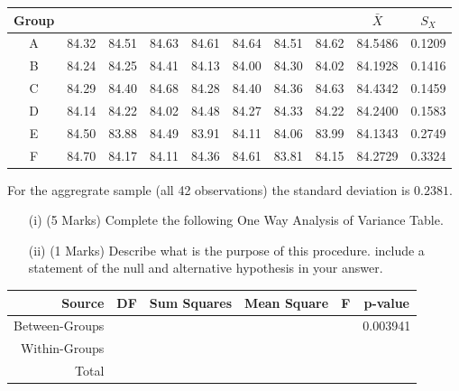 \documentclass[a4paper,12pt]{article}
\begin{document}
	\begin{tabular}{|c|ccccccc|c|c|}
		\hline
		Group &  & &  &  &  &  &  & $\bar{X}$& $S_{X}$ \\ \hline
		A & 84.32 & 84.51 & 84.63 & 84.61 & 84.64 & 84.51 & 84.62 & 84.5486 & 0.1209 \\ \hline
		B & 84.24 & 84.25 & 84.41 & 84.13 & 84.00 & 84.30 & 84.02 & 84.1928 & 0.1416 \\ \hline
		C & 84.29 & 84.40 & 84.68 & 84.28 & 84.40 & 84.36 & 84.63 & 84.4342 & 0.1459 \\ \hline
		D & 84.14 & 84.22 & 84.02 & 84.48 & 84.27 & 84.33 & 84.22 & 84.2400 & 0.1583 \\ \hline
		E & 84.50 & 83.88 & 84.49 & 83.91 & 84.11 & 84.06 & 83.99 & 84.1343 & 0.2749 \\ \hline
		F & 84.70 & 84.17 & 84.11 & 84.36 & 84.61 & 83.81 & 84.15 & 84.2729 & 0.3324 \\ \hline
	\end{tabular} 
	


\bigskip
For the aggregrate sample (all 42 observations) the standard deviation is $0.2381$.

\begin{itemize}
	\item[(i)] (5 Marks) Complete the following One Way Analysis of Variance Table.
	\item[(ii)] (1 Marks) Describe what is the purpose of this procedure. include a statement of the null and alternative hypothesis in your answer.
\end{itemize}
\begin{tabular}{|r|c|c|c|c|c|}
	\hline Source  &\phantom{sp} DF \phantom{sp} & Sum Squares & Mean Square  & \phantom{sp} F \phantom{sp} & p-value  \\ 
	\hline Between-Groups &  &  &  &  & 0.003941 \\ 
	\hline Within-Groups &  &  &  &  &  \\ \hline
	\hline Total &  &  &  &  &  \\ 
	\hline 
\end{tabular} 

\newpage
\end{document}

